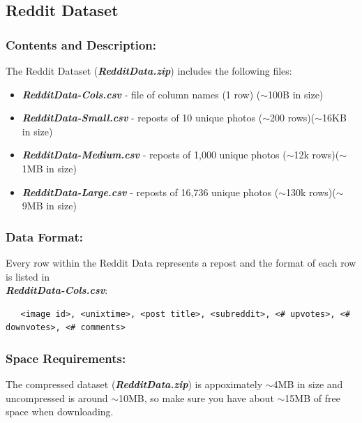 \documentclass{article}
\begin{document}
\subsection{Reddit Dataset}

\subsubsection*{Contents and Description:}
The Reddit Dataset (\textbf{\textit{RedditData.zip}}) includes the following files:
\begin{itemize}
    \item \textit{\textbf{RedditData-Cols.csv}} - file of column names (1 row) ($\sim$100B in size)
    \item \textit{\textbf{RedditData-Small.csv}} - reposts of 10 unique photos ($\sim$200 rows)($\sim$16KB in size)
    \item \textit{\textbf{RedditData-Medium.csv}} - reposts of 1,000 unique photos ($\sim$12k rows)($\sim$1MB in size)
    \item \textit{\textbf{RedditData-Large.csv}} - reposts of 16,736 unique photos ($\sim$130k rows)($\sim$9MB in size)
\end{itemize}

\subsubsection*{Data Format:}
Every row within the Reddit Data represents a repost and the format of each row is listed in \\ \textbf{\textit{RedditData-Cols.csv}}:
\small
\begin{verbatim}
   <image id>, <unixtime>, <post title>, <subreddit>, <# upvotes>, <# downvotes>, <# comments>
\end{verbatim}
\normalsize

\subsubsection*{Space Requirements:}
The compressed dataset (\textbf{\textit{RedditData.zip}}) is appoximately $\sim$4MB in size and uncompressed is around $\sim$10MB, so make sure you have about $\sim$15MB of free space when downloading.
\end{document}
